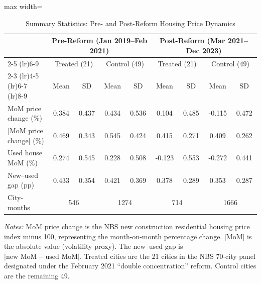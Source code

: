\begin{table}[H]
\centering
\caption{Summary Statistics: Pre- and Post-Reform Housing Price Dynamics}
\label{tab:summary}
\begin{threeparttable}
\begin{adjustbox}{max width=\textwidth}
\begin{tabular}{lcccccccc}
\toprule
 & \multicolumn{4}{c}{Pre-Reform (Jan 2019--Feb 2021)} & \multicolumn{4}{c}{Post-Reform (Mar 2021--Dec 2023)} \\
\cmidrule(lr){2-5} \cmidrule(lr){6-9}
 & \multicolumn{2}{c}{Treated (21)} & \multicolumn{2}{c}{Control (49)} & \multicolumn{2}{c}{Treated (21)} & \multicolumn{2}{c}{Control (49)} \\
\cmidrule(lr){2-3} \cmidrule(lr){4-5} \cmidrule(lr){6-7} \cmidrule(lr){8-9}
 & Mean & SD & Mean & SD & Mean & SD & Mean & SD \\
\midrule
MoM price change (\%) & 0.384 & 0.437 & 0.434 & 0.536 & 0.104 & 0.485 & -0.115 & 0.472 \\
$|$MoM price change$|$ (\%) & 0.469 & 0.343 & 0.545 & 0.424 & 0.415 & 0.271 & 0.409 & 0.262 \\
Used house MoM (\%) & 0.274 & 0.545 & 0.228 & 0.508 & -0.123 & 0.553 & -0.272 & 0.441 \\
New--used gap (pp) & 0.433 & 0.354 & 0.421 & 0.369 & 0.378 & 0.289 & 0.353 & 0.287 \\
\midrule
City-months & \multicolumn{2}{c}{546} & \multicolumn{2}{c}{1274} & \multicolumn{2}{c}{714} & \multicolumn{2}{c}{1666} \\
\bottomrule
\end{tabular}
\end{adjustbox}
\par\vspace{0.3em}
{\footnotesize \textit{Notes:} MoM price change is the NBS new construction residential housing price index minus 100, representing the month-on-month percentage change. $|$MoM$|$ is the absolute value (volatility proxy). The new--used gap is $|\text{new MoM} - \text{used MoM}|$. Treated cities are the 21 cities in the NBS 70-city panel designated under the February 2021 ``double concentration'' reform. Control cities are the remaining 49.}
\end{threeparttable}
\end{table}

